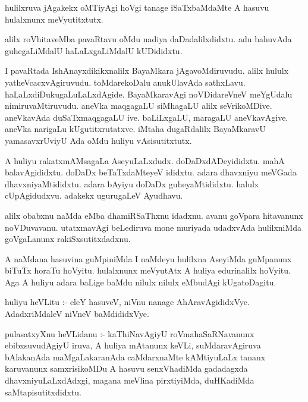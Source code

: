 \documentclass{article}
\begin{document}
\begin{mn}
hulilxruva  jAgakekx  oMTiyAgi  hoVgi  tanage  iSaTxbaMdaMte  A  hasuvu  
hulalxnunx  meVyutitxtutx.
\end{mn}

\begin{mn}
alilx  roVhitaveMba  pavaRtavu  oMdu  nadiya  daDadalilxdidxtu.  adu  
bahuvAda  guhegaLiMdalU  haLaLxgaLiMdalU  kUDididxtu.
\end{mn}

\begin{mn}
I pavaRtada  IshAnayxdikikxnalilx  BayaMkara  jAgavoMdiruvudu.  alilx  hululx  
yatheVcacxvAgiruvudu.  toMdarekoDalu  anukUlavAda  sathxLavu.  haLaLxdiDukugaLuLaLxdAgide. 
BayaMkaravAgi  noVDidareVneV  meYgUdalu  nimiruvaMtiruvudu.  aneVka  maqgagaLU  siMhagaLU  
alilx seVrikoMDive.  aneVkavAda  duSaTxmaqgagaLU  ive.  baLiLxgaLU,  maragaLU  
aneVkavAgive.  aneVka  narigaLu  kUgutitxrutatxve.  iMtaha  dugaRdalilx  BayaMkaravU  
yamasavxrUviyU  Ada  oMdu  huliyu  vAsisutitxtutx.
\end{mn}

\begin{mn}
A  huliyu  rakatxmAMsagaLa  AseyuLaLxdudx.  doDaDxdADeyididxtu.  mahA  balavAgididxtu.  
doDaDx  beTaTxdaMteyeV  ididxtu.  adara  dhavxniyu  meVGada  dhavxniyaMtididxtu.  adara  
bAyiyu  doDaDx  guheyaMtididxtu.  halulx  cUpAgidudxvu.  adakekx  ugurugaLeV  Ayudhavu.
\end{mn}

\begin{mn}
alilx  obabxnu  naMda  eMba  dhamiRSaThxnu  idadxnu.  avanu  goVpara  hitavanunx  noVDuvavanu.  
utatxmavAgi  beLediruva  mone muriyada  udadxvAda  hulilxniMda  goVgaLanunx  rakiSxsutitxdadxnu.
\end{mn}

\begin{mn}
A  naMdana  hasuvina  guMpiniMda  I  naMdeyu  hulilxna  AseyiMda  guMpanunx  biTuTx  
horaTu hoVyitu.  hulalxnunx  meVyutAtx  A  huliya  edurinalilx  hoVyitu.  Aga  A  
huliyu  adara  baLige  baMdu  nilulx  nilulx  eMbudAgi  kUgatoDagitu.
\end{mn}

\begin{mn}
huliyu  heVLitu :- eleY  hasuveV,  niVnu  nanage  AhAravAgididxVye.  AdadxriMdaleV  niVneV  baMdididxVye.
\end{mn}

\begin{mn}
pulasatxyXnu  heVLidanu :-  kaThiNavAgiyU  roVmahaSaRNavanunx  ebibxsuvudAgiyU  iruva,  
A  huliya  mAtanunx  keVLi,  suMdaravAgiruva  bAlakanAda  maMgaLakaranAda  caMdarxnaMte  
kAMtiyuLaLx  tananx  karuvanunx  samxrisikoMDu  A  hasuvu  senxVhadiMda  gadadagxda  
dhavxniyuLaLxdAdxgi,  magana  meVlina  pirxtiyiMda,  duHKadiMda  saMtapisutitxdidxtu.
\end{mn}
\end{document}
